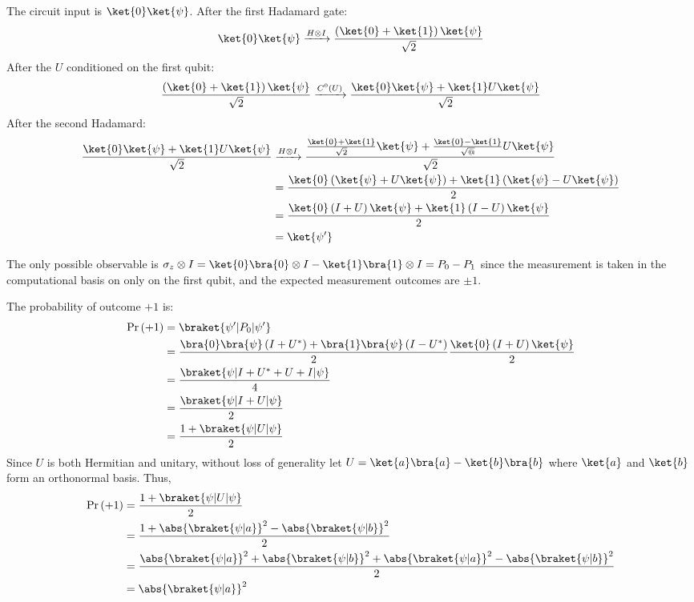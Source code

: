\begingroup
\newcommand{\ketbra}[2]{\ket{#1} \bra{#2}}
\newcommand{\pr}[1]{\Pr \left( #1 \right)}
%
\par The circuit input is $\ket{0} \ket{\psi}$.
%
After the first Hadamard gate:
%
$$
\ket{0} \ket{\psi} \xrightarrow{H \otimes I} \frac{\left( \ket{0} + \ket{1} \right) \ket{\psi}}{\sqrt{2}}
$$
%
After the $U$ conditioned on the first qubit:
%
$$
\frac{\left( \ket{0} + \ket{1} \right) \ket{\psi}}{\sqrt{2}} \xrightarrow{C^0 \left( U \right)} \frac{\ket{0} \ket{\psi} + \ket{1} U \ket{\psi}}{\sqrt{2}}
$$
%
After the second Hadamard:
%
\begin{align*}
\frac{\ket{0} \ket{\psi} + \ket{1} U \ket{\psi}}{\sqrt{2}} &\xrightarrow{H \otimes I} \frac{\frac{\ket{0} + \ket{1}}{\sqrt{2}} \ket{\psi} + \frac{\ket{0} - \ket{1}}{\sqrt{@}} U \ket{\psi}}{\sqrt{2}} \\
&= \frac{\ket{0} \left( \ket{\psi} + U \ket{\psi} \right) + \ket{1} \left( \ket{\psi} - U \ket{\psi}  \right)}{2} \\
&= \frac{\ket{0} \left( I + U \right) \ket{\psi} + \ket{1} \left( I - U \right ) \ket{\psi}}{2} \\
&= \ket{\psi'}
\end{align*}
%
\par The only possible observable is $\sigma_z \otimes I = \ketbra{0}{0} \otimes I - \ketbra{1}{1} \otimes I = P_0 - P_1$ since the measurement is taken in the computational basis on only on the first qubit, and the expected measurement outcomes are $\pm 1$.
%
\par The probability of outcome $+1$ is:
%
\begin{align*}
\pr{+1} &= \braket{\psi' | P_0 | \psi'} \\
&= \frac{\bra{0} \bra{\psi} \left( I + U^* \right) + \bra{1} \bra{\psi} \left( I - U^* \right )}{2} \frac{\ket{0} \left( I + U \right) \ket{\psi}}{2} \\
&= \frac{\braket{\psi | I + U^* + U + I | \psi}}{4} \\
&= \frac{\braket{\psi | I + U | \psi}}{2} \\
&= \frac{1 + \braket{\psi | U | \psi}}{2}
\end{align*}
%
Since $U$ is both Hermitian and unitary, without loss of generality let $U = \ketbra{a}{a} - \ketbra{b}{b}$ where $\ket{a}$ and $\ket{b}$ form an orthonormal basis.
%
Thus,
%
\begin{align*}
\pr{+1} &= \frac{1 + \braket{\psi | U | \psi}}{2} \\
&= \frac{1 + \abs{\braket{\psi|a}}^2 - \abs{\braket{\psi|b}}^2}{2} \\
&= \frac{\abs{\braket{\psi|a}}^2 + \abs{\braket{\psi|b}}^2 + \abs{\braket{\psi|a}}^2 - \abs{\braket{\psi|b}}^2}{2} \\
&= \abs{\braket{\psi|a}}^2
\end{align*}
